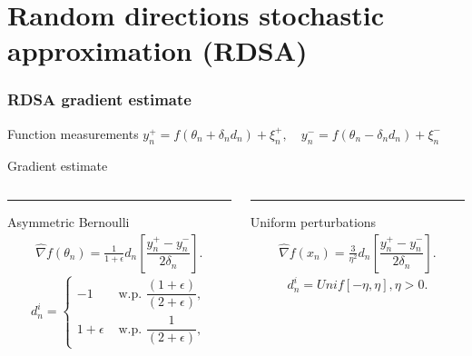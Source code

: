 \section{Random directions stochastic approximation (RDSA)}
\begin{frame}
\begin{small}
\frametitle{\centering  RDSA gradient estimate}

\begin{block}{Function measurements}
$y_{n}^+ = f(\theta_n+\delta_n d_n) + \xi_{n}^+,\quad y_{n}^- = f(\theta_n-\delta_n d_n) + \xi_{n}^-$
\end{block}
\begin{block}{Gradient estimate}
\begin{columns}[T]
\begin{column}{.48\textwidth}
\color{red}\rule{\linewidth}{4pt}
Asymmetric Bernoulli
\begin{align}
\label{eq:grad-unif}
\widehat\nabla f(\theta_n) = \frac{1}{1+\epsilon} d_n \left[ \dfrac{y_n^+ - y_n^-}{2\delta_n}\right].
\end{align}
\begin{equation}
\label{eq:det-proj}
 d_n^i =
  \begin{cases}
   -1 &  \text{ w.p. } \dfrac{(1+\epsilon)}{(2+\epsilon)}, \\
   1+\epsilon &  \text{ w.p. } \dfrac{1}{(2+\epsilon)},
  \end{cases}
\end{equation}
\end{column}
\begin{column}{.48\textwidth}
\color{blue}\rule{\linewidth}{4pt}
Uniform perturbations
\begin{align}
\label{eq:grad-unif}
\widehat\nabla f(x_n) = \frac3{\eta^2} d_n \left[ \dfrac{y_n^+ - y_n^-}{2\delta_n}\right].
\end{align}
\begin{equation}
\label{eq:det-proj-unif}
 d_n^i = Unif[-\eta,\eta], \eta>0.
 \end{equation}
\end{column}
\end{columns}
\end{block}
\end{small}
\end{frame}


